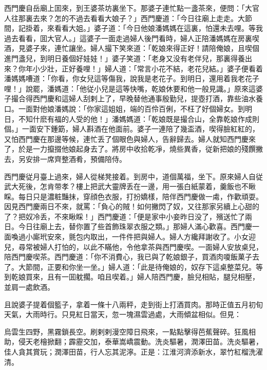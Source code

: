 西門慶自岳廟上囬來，到王婆茶坊裏坐下。那婆子連忙點一盞茶來，便問：「大官人往那裏去來？怎的不過去看看大娘子？」西門慶道：「今日往廟上走走。大節間，記掛着，來看看大姐。」婆子道：「今日他娘潘媽媽在這裏，怕還未去哩。等我過去看看，囬大官人。」這婆子一面走過婦人後門看時，婦人正陪潘媽媽在房裏喫酒，見婆子來，連忙讓坐。婦人撮下笑來道：「乾娘來得正好！請陪俺娘，且喫個進門盞兒，到明日養個好娃娃！」婆子笑道：「老身又没有老伴兒，那裏得養出來？你年小少壯，正好養哩！」婦人道：「常言小花不結，老花兒結。」婆子便看着潘媽媽嘈道：「你看，你女兒這等傷我，說我是老花子。到明日，還用着我老花子哩！」說罷，潘媽道：「他従小兒是這等快嘴，乾娘休要和他一般見識。」原來這婆子撮合得西門慶和這婦人刮剌上了，早晚替他通事殷勤兒，提壺打酒，靠些油水養口。一面對他娘潘媽說：「你家這姐姐，端的百伶百俐，不枉了好個婦女。到明日，不知什麽有福的人受的他！」潘媽媽道：「乾娘既是撮合山，全靠乾娘作成則個。」一面安下鍾筯，婦人斟酒在他面前。婆子一連陪了幾盃酒，喫得臉紅紅的，又怕西門慶在那邊等候，連忙丢了個眼色與婦人，告辭歸去。婦人就知西門慶來了，於是一力攛掇他娘起身去了。將房中收拾乾凈，燒些異香，従新把娘的殘饌撇去，另安排一席齊整酒肴，預備陪侍。

西門慶従月臺上過來，婦人從梯凳接着。到房中，道個萬福，坐下。原來婦人自従武大死後，怎肯带孝？樓上把武大靈牌丢在一邊，用一張白紙蒙着，羹飯也不瞅睬。每日只是濃粧豔抹，穿顔色衣服，打扮嬌樣，陪伴西門慶做一䖏，作歡頑耍。因見西門慶兩日不來，就罵：「負心的賊！如何撇閃了奴，又往那家另續上心甜的了？把奴冷丢，不來瞅睬！」西門慶道：「便是家中小妾昨日没了，殯送忙了兩日。今日往廟上去，替你置了些首飾珠翠衣服之類。」那婦人滿心歡喜。西門慶一面喚過小廝玳安來，氈包内取出，一件件把與婦人。婦人方纔拜謝收了。小女迎兒，尋常被婦人打怕的，以此不瞞他，令他拿茶與西門慶喫。一面婦人安放桌兒，陪西門慶喫茶。西門慶道：「你不消費心，我已與了乾娘銀子，買酒肉嗄飯菓子去了。大節間，正要和你坐一坐。」婦人道：「此是待俺娘的，奴存下這桌整菜兒。等到乾娘買來，且有一囬躭擱。咱且喫着。」婦人陪西門慶，臉兒相貼，腿兒相壓，並肩一處飲酒。

且說婆子提着個籃子，拿着一條十八兩秤，走到街上打酒買肉。那時正值五月初旬天氣，大雨時行。只見紅日當天，忽一塊濕雲過處，大雨傾盆相似。但見：
\begin{myquote}
烏雲生四野，黑霧鎖長空。刷剌剌漫空障日飛來，一點點擊得芭蕉聲碎。狂風相助，侵天老檜掀翻；霹靂交加，泰華嵩嶠震動。洗炎驅暑，潤澤田苗。洗炎驅暑，佳人貪其賞玩；潤澤田苗，行人忘其泥濘。正是：江淮河濟添新水，翠竹紅榴洗濯清。
\end{myquote}

